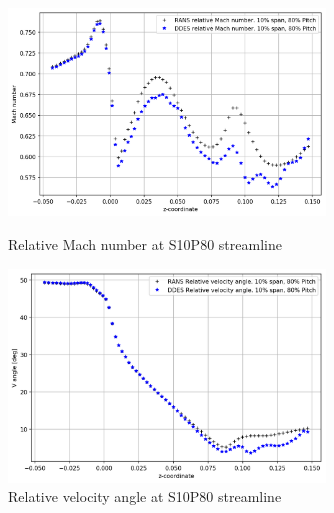 \begin{figure}[ht]
  \centering
  \includegraphics[width=0.75\textwidth]{Pictures/mach-rel-S10-P80.png}
  \caption{Relative Mach number at S10P80 streamline} \label{mach-rel-S10-P80}
  \vspace*{\floatsep}%
  \includegraphics[width=0.75\textwidth]{Pictures/vang-rel-S10-P80.png}
  \caption{Relative velocity angle at S10P80 streamline} \label{vang-rel-S10-P80}
\end{figure}

